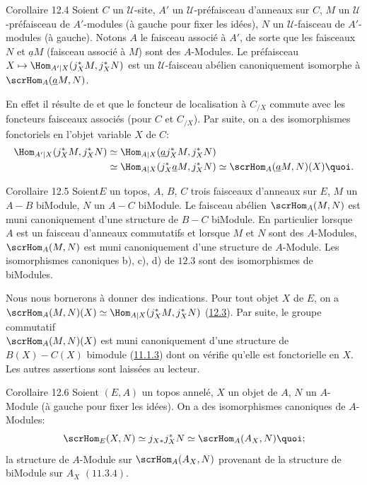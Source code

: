 \begin{enonce*}{Corollaire 12.4}
Soient $C$ un $𝒰$-site, $A'$ un $𝒰$-préfaisceau
d'anneaux sur $C$, $M$ un $𝒰$-préfaisceau de $A'$-modules (à
gauche pour fixer les idées), $N$ un $𝒰$-faisceau de
$A'$-modules (à gauche). Notons $A$ le faisceau associé à $A'$, de
sorte que les faisceaux $N$ et $\underline{a}M$ (faisceau associé à $M$)
sont des $A$-Modules. Le préfaisceau $X\mapsto \Hom_{A'|
X}(j^{\ast}_XM, j^{\ast}_XN)$ est un $𝒰$-faisceau abélien
canoniquement isomorphe à $\scrHom_A(\underline{a}M,N)$.
\end{enonce*}

En effet il résulte de  et  que
le foncteur de localisation à $C_{/X}$ commute avec les foncteurs
faisceaux associés (pour $C$ et $C_{/X}$). Par suite, on a des
isomorphismes fonctoriels en l'objet variable $X$ de $C$:
\begin{align*}
\Hom_{A'| X}(j^{\ast}_XM, j^{\ast}_XN) &\simeq \Hom_{A|
X}(\underline{a}j^{\ast}_XM, j^{\ast}_XN)\\
&\simeq \Hom_{A| X}(j^{\ast}_X \underline{a}M, j^{\ast}_XN)\simeq
\scrHom_A (\underline{a}M, N)(X){\quoi}.
\end{align*}

\begin{enonce*}{Corollaire 12.5}
Soient\pageoriginale $E$ un topos, $A$, $B$, $C$ trois faisceaux
d'anneaux sur $E$, $M$ un $A-B$ biModule, $N$ un $A-C$ biModule. Le
faisceau abélien $\scrHom_A(M,N)$ est muni canoniquement d'une
structure de $B-C$ biModule. En particulier lorsque $A$ est un
faisceau d'anneaux commutatifs et lorsque $M$ et $N$ sont des
$A$-Modules, $\scrHom_A(M,N)$ est muni canoniquement d'une structure
de $A$-Module. Les isomorphismes canoniques {\rm b), c), d)} de
$\hyperref[IV.prop12.3]{12.3}$ sont des isomorphismes de biModules.
\end{enonce*}

Nous nous bornerons à donner des indications. Pour tout objet $X$ de
$E$, on a $\scrHom_A(M,N)(X)\simeq \Hom_{A| X}(j^{\ast}_XM,
j^{\ast}_XN)$ (\hyperref[IV.prop12.3]{12.3}). Par suite, le groupe commutatif\\
$\scrHom_A(M,N)(X)$ est muni canoniquement d'une structure de
$B(X)-C(X)$ bimodule (\hyperref[IV.subsubsec11.1.3]{11.1.3}) dont on vérifie
qu'elle est fonctorielle en $X$. Les autres assertions sont laissées
au lecteur.

\begin{enonce*}{Corollaire 12.6}
Soient $(E,A)$ un topos annelé, $X$ un objet de $A$, $N$ un
$A$-Module (à gauche pour fixer les idées). On a des isomorphismes
canoniques de $A$-Modules:
$$
\scrHom_E(X,N)\simeq j_{X\ast}j^{\ast}_XN\simeq \scrHom_A(A_X,
N){\quoi};
$$
la structure de $A$-Module sur $\scrHom_A(A_X,N)$ provenant de la
structure de biModule sur $A_X$ $(\hyperref[IV.rem11.3.4]{11.3.4})$.
\end{enonce*}

